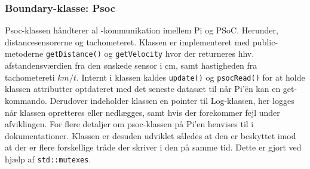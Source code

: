 \subsubsection{Boundary-klasse: Psoc} \label{sec:psoc_klasse}

Psoc-klassen håndterer al \IIC-kommunikation imellem Pi og PSoC. Herunder, distancesensorerne og tachometeret. 
Klassen er implementeret med public-metoderne \texttt{getDistance()} og \texttt{getVelocity} hvor der returneres hhv. afstandensværdien fra den ønskede sensor i cm, samt hastigheden fra tachometereti $km/t$. 
Internt i klassen kaldes \texttt{update()} og \texttt{psocRead()} for at holde klassen attributter optdateret med det seneste datasæt til når Pi'ën kan en get-kommando. 
Derudover indeholder klassen en pointer til Log-klassen, her logges når klassen opretteres eller nedlægges, samt hvis der forekommer fejl under afviklingen. For flere detaljer om psoc-klassen på Pi'en henvises til  i dokumentationer.
Klassen er desuden udviklet således at den er beskyttet imod at der er flere forskellige tråde der skriver
i den på samme tid. Dette er gjort ved hjælp af \texttt{std::mutexes}.